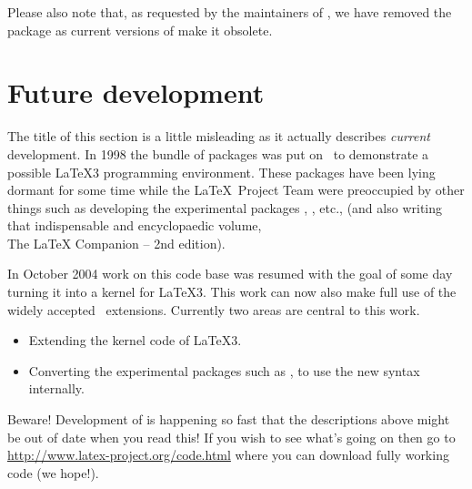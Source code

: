 \documentclass
    [lw35fonts]    %
     {ltnews}[2004/02/28]
\begin{document}
Please also note that, as requested by the maintainers of
, we have removed the package  as
current versions of  make it obsolete.

\newpage


\section{Future development}

The title of this section is a little misleading as it actually
describes \emph{current} development. In 1998 the 
bundle of packages was put on \ctan\ to demonstrate a possible \LaTeX3
programming environment. These packages have been lying dormant for some
time while the \LaTeX\ Project Team were preoccupied by other things
such as developing the experimental packages ,
, etc., (and also writing that indispensable
and encyclopaedic volume,\\
The \LaTeX{} Companion -- 2nd edition).

In October 2004 work on this code base was resumed with the goal of
some day turning it into a kernel for \LaTeX3.  This work can now
also make full use of the widely accepted \eTeX\ extensions. Currently
two areas are central to this work.

\begin{itemize}
\item Extending the
  kernel code of \LaTeX3.
\item Converting the experimental packages
  such as ,  to use the new
  syntax internally.
\end{itemize}

Beware! Development of
 is happening so fast that the descriptions above might
be out of date when you read this! If you wish to see what's going on
then go to
\url{http://www.latex-project.org/code.html} where you can download
 fully working code (we hope!).
\end{document}
